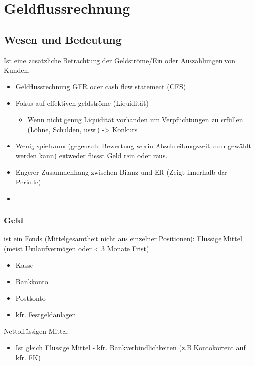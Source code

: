 
\section{Geldflussrechnung}

\subsection{Wesen und Bedeutung}
Ist eine zusätzliche Betrachtung der Geldströme/Ein oder
Auszahlungen von Kunden.
\begin{itemize}
    \item Geldflussrechnung GFR oder cash flow statement (CFS)
    \item Fokus auf effektiven geldströme (Liquidität)
    \begin{itemize}
        \item Wenn nicht genug Liquidität vorhanden um
        Verpflichtungen zu erfüllen (Löhne, Schulden, usw.) -> Konkurs
    \end{itemize}
    \item Wenig spielraum (gegensatz Bewertung worin
    Abschreibungszeitraum gewählt werden kann) entweder fliesst
    Geld rein oder raus.
    \item Engerer Zusammenhang zwischen Bilanz und ER (Zeigt
    innerhalb der Periode)
    \item 
\end{itemize}

\subsubsection{Geld}
\begin{definition}
     ist ein Fonds (Mittelgesamtheit nicht aus einzelner
    Positionen): Flüssige Mittel (meist Umlaufvermögen oder < 3
    Monate Frist)
    \begin{itemize}
        \item Kasse
        \item Bankkonto
        \item Postkonto
        \item kfr. Festgeldanlagen
    \end{itemize}
    Nettoflüssigen Mittel:
    \begin{itemize}
        \item Ist gleich Flüssige Mittel - kfr.
        Bankverbindlichkeiten (z.B Kontokorrent auf kfr. FK)
    \end{itemize}
\end{definition}


